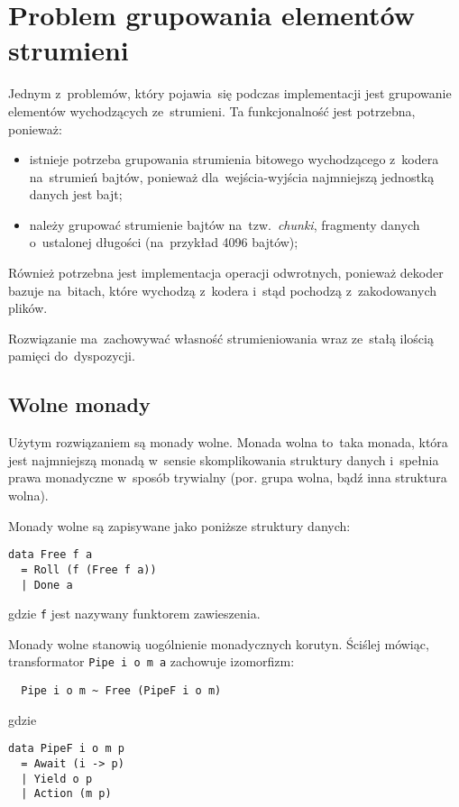 \documentclass[../../praca.tex]{subfiles}
\begin{document}
\section{Problem grupowania elementów strumieni}

Jednym z~problemów, który pojawia~się podczas implementacji jest grupowanie elementów
wychodzących ze~strumieni. Ta funkcjonalność jest potrzebna, ponieważ:
\begin{itemize}
  \item istnieje potrzeba grupowania strumienia bitowego wychodzącego z~kodera
    na~strumień bajtów, ponieważ dla~wejścia-wyjścia najmniejszą jednostką danych
    jest bajt;
  \item należy grupować strumienie bajtów na~tzw.~\emph{chunki}, fragmenty
    danych o~ustalonej długości (na~przykład 4096 bajtów);
\end{itemize}
Również potrzebna jest implementacja operacji odwrotnych, ponieważ dekoder
bazuje na~bitach, które wychodzą z~kodera i~stąd pochodzą z~zakodowanych plików.

Rozwiązanie ma~zachowywać własność strumieniowania wraz ze~stałą ilością pamięci
do~dyspozycji.

\subsection{Wolne monady}

Użytym rozwiązaniem są monady wolne. Monada wolna to~taka monada, która
jest najmniejszą monadą w~sensie skomplikowania struktury danych i~spełnia 
prawa monadyczne w~sposób trywialny (por. grupa wolna, bądź
inna struktura wolna).

Monady wolne są zapisywane jako poniższe struktury danych:
\begin{verbatim}
data Free f a
  = Roll (f (Free f a))
  | Done a
\end{verbatim}
gdzie \texttt{f} jest nazywany funktorem zawieszenia.

Monady wolne stanowią uogólnienie monadycznych korutyn. Ściślej mówiąc,
transformator \texttt{Pipe i o m a} zachowuje izomorfizm:

\begin{verbatim}
  Pipe i o m ~ Free (PipeF i o m)
\end{verbatim}
gdzie
\begin{verbatim}
data PipeF i o m p
  = Await (i -> p)
  | Yield o p
  | Action (m p)
\end{verbatim}
\end{document}
